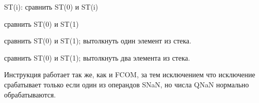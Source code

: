   \item[FUCOM] ST(i): сравнить ST(0) и ST(i)
  \item[FUCOM] сравнить ST(0) и ST(1)
  \item[FUCOMP] сравнить ST(0) и ST(1); вытолкнуть один элемент из стека.
  \item[FUCOMPP] сравнить ST(0) и ST(1); вытолкнуть два элемента из стека.
 
Инструкция работает так же, как и FCOM, за тем исключением что исключение срабатывает только
  если один из операндов SNaN, но числа QNaN нормально обрабатываются.
